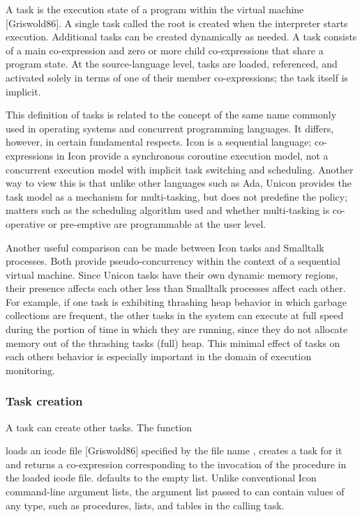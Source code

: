 A task is the execution state of a program within the virtual machine
[Griswold86]. A single task called the root is created when the
interpreter starts execution. Additional tasks can be created
dynamically as needed.
A task consists of a main co-expression and zero or more child
co-expressions that share a program state. At the source-language
level, tasks are loaded, referenced, and activated solely in terms of
one of their member co-expressions; the task itself is
implicit.

This definition of tasks is related to the concept of the same name
commonly used in operating systems and concurrent programming
languages. It differs, however, in certain fundamental respects. Icon
is a sequential language; co-expressions in Icon provide a synchronous
coroutine execution model, not a concurrent execution model with
implicit task switching and scheduling. Another way to view this is
that unlike other languages such as Ada, Unicon provides the task model
as a mechanism for multi-tasking, but does not predefine the policy;
matters such as the scheduling algorithm used and whether multi-tasking
is co-operative or pre-emptive are programmable at the user
level.

Another useful comparison can be made between Icon tasks and Smalltalk
processes. Both provide pseudo-concurrency within the context of a
sequential virtual machine. Since Unicon tasks have their own dynamic
memory regions, their presence affects each other less than Smalltalk
processes affect each other. For example, if one task is exhibiting
thrashing heap behavior in which garbage collections are frequent, the
other tasks in the system can execute at full speed during the portion
of time in which they are running, since they do not allocate memory
out of the thrashing task{\textquotesingle}s (full) heap. This minimal
effect of tasks on each others{\textquotesingle} behavior is especially
important in the domain of execution monitoring. 

\subsubsection{Task creation}

A task can create other tasks. The function 


\noindent loads an icode file [Griswold86] specified by the file name
, creates a task for it and returns a
co-expression corresponding to the invocation of the procedure
 in the loaded icode file.
\textstyleSourceText{ }defaults to the
empty list. Unlike conventional Icon command-line argument lists, the
argument list passed to\textstyleSourceText{
} can contain values of any type,
such as procedures, lists, and tables in the calling task.


